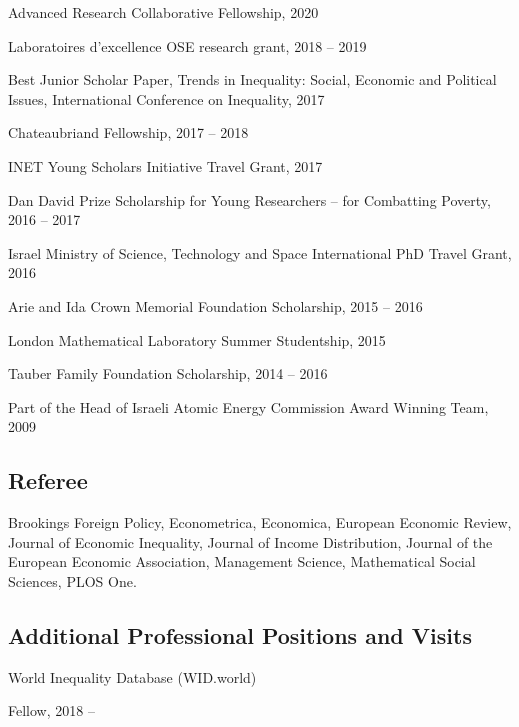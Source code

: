 \documentclass[10pt]{article}
\renewenvironment{itemize}{
  \begin{list}{}{
      \setlength{\leftmargin}{1.0em}
      \setlength{\itemsep}{0.1em}
      \setlength{\parskip}{0pt}
      \setlength{\parsep}{0.2em}
    }
}{
  \end{list}
}
\begin{document}
\begin{itemize}
\item Advanced Research Collaborative Fellowship, 2020
\item Laboratoires d'excellence OSE research grant, 2018 -- 2019
\item Best Junior Scholar Paper, Trends in Inequality: Social, Economic and Political Issues, International Conference on Inequality, 2017
\item Chateaubriand Fellowship, 2017 -- 2018
\item INET Young Scholars Initiative Travel Grant, 2017
\item Dan David Prize Scholarship for Young Researchers -- for Combatting Poverty, 2016 -- 2017
\item Israel Ministry of Science, Technology and Space International PhD Travel Grant, 2016
\item Arie and Ida Crown Memorial Foundation Scholarship, 2015 -- 2016
\item London Mathematical Laboratory Summer Studentship, 2015
\item Tauber Family Foundation Scholarship, 2014 -- 2016
\item Part of the Head of Israeli Atomic Energy Commission Award Winning Team, 2009
\end{itemize}

\subsection*{Referee}

Brookings Foreign Policy, Econometrica, Economica, European Economic Review, Journal of Economic Inequality, Journal of Income Distribution, Journal of the European Economic Association, Management Science, Mathematical Social Sciences, PLOS One.

\subsection*{Additional Professional Positions and Visits}

\begin{itemize}
\item World Inequality Database (WID.world)
  \begin{itemize}
  \item Fellow, 2018 --
  \end{itemize}
\end{itemize}
\end{document}
